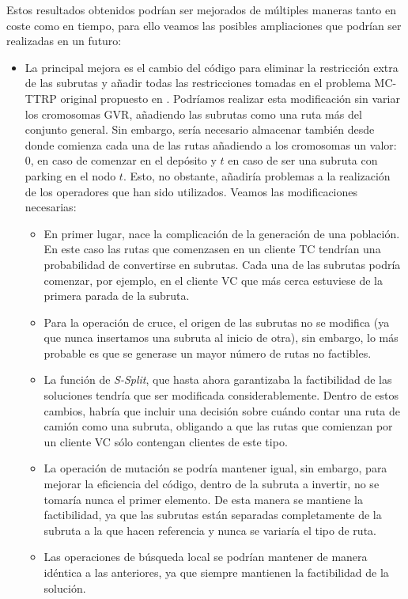 Estos resultados obtenidos podrían ser mejorados de múltiples maneras tanto en coste como en tiempo, para ello veamos las posibles ampliaciones que podrían ser realizadas en un futuro:
\begin{itemize}
    \item La principal mejora es el cambio del código para eliminar la restricción extra de las subrutas y añadir todas las restricciones tomadas en el problema MC-TTRP original propuesto en \cite{laura-mcttrp}. Podríamos realizar esta modificación sin variar los cromosomas GVR, añadiendo las subrutas como una ruta más del conjunto general. Sin embargo, sería necesario almacenar también desde donde comienza cada una de las rutas añadiendo a los cromosomas un valor: 0, en caso de comenzar en el depósito y $t$ en caso de ser una subruta con parking en el nodo $t$. Esto, no obstante, añadiría problemas a la realización de los operadores que han sido utilizados. Veamos las modificaciones necesarias:
    \begin{itemize}
        \item En primer lugar, nace la complicación de la generación de una población. En este caso las rutas que comenzasen en un cliente TC tendrían una probabilidad de convertirse en subrutas. Cada una de las subrutas podría comenzar, por ejemplo, en el cliente VC que más cerca estuviese de la primera parada de la subruta.
        \item Para la operación de cruce, el origen de las subrutas no se modifica (ya que nunca insertamos una subruta al inicio de otra), sin embargo, lo más probable es que se generase un mayor número de rutas no factibles.
        \item La función de \textit{S-Split}, que hasta ahora garantizaba la factibilidad de las soluciones tendría que ser modificada considerablemente. Dentro de estos cambios, habría que incluir una decisión sobre cuándo contar una ruta de camión como una subruta, obligando a que las rutas que comienzan por un cliente VC sólo contengan clientes de este tipo.
        \item La operación de mutación se podría mantener igual, sin embargo, para mejorar la eficiencia del código, dentro de la subruta a invertir, no se tomaría nunca el primer elemento. De esta manera se mantiene la factibilidad, ya que las subrutas están separadas completamente de la subruta a la que hacen referencia y nunca se variaría el tipo de ruta.
        \item Las operaciones de búsqueda local se podrían mantener de manera idéntica a las anteriores, ya que siempre mantienen la factibilidad de la solución.

\end{itemize}
\end{itemize}
